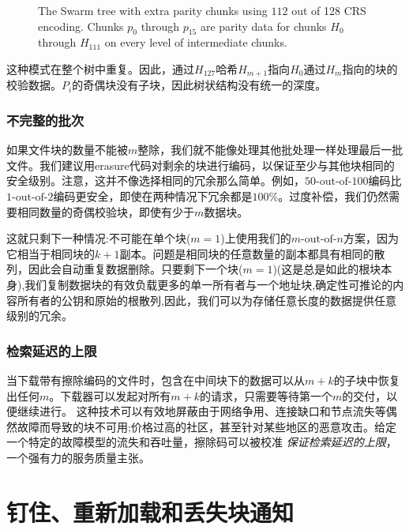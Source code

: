 \begin{figure}[htbp]
   \centering
   \resizebox{1\textwidth}{!}{
        
   }
   \caption[Swarm hash erasure \statusgreen]{The Swarm tree with extra parity chunks using $112$ out of 128 CRS encoding. Chunks $p_{0}$ through $p_{15}$ are parity data for chunks $H_0 $ through $H_{111}$ on every level of intermediate chunks.}
   \label{fig:Swarm-hash-erasure}
\end{figure}


这种模式在整个树中重复。因此，通过$H_{127}$哈希$H_{m+1}$指向$H_0$通过$H_{m}$指向的块的校验数据。$P_i$的奇偶块没有子块，因此树状结构没有统一的深度。

\subsubsection{不完整的批次}

如果文件块的数量不能被$m$整除，我们就不能像处理其他批处理一样处理最后一批文件。我们建议用erasure代码对剩余的块进行编码，以保证至少与其他块相同的安全级别。注意，这并不像选择相同的冗余那么简单。例如，$50\text{-out-of-}100$编码比$1\text{-out-of-}2$编码更安全，即使在两种情况下冗余都是$100\%$。过度补偿，我们仍然需要相同数量的奇偶校验块，即使有少于$m$数据块。

这就只剩下一种情况:不可能在单个块($m=1$)上使用我们的$m\text{-out-of-}n$方案，因为它相当于相同块的$k+1$副本。问题是相同块的任意数量的副本都具有相同的散列，因此会自动重复数据删除。只要剩下一个块($m=1$)(这是总是如此的根块本身),我们复制数据块的有效负载更多的单一所有者与一个地址块,确定性可推论的内容所有者的公钥和原始的根散列,因此，我们可以为存储任意长度的数据提供任意级别的冗余。

\subsubsection{检索延迟的上限}

当下载带有擦除编码的文件时，包含在中间块下的数据可以从$m+k$的子块中恢复出任何$m$。下载器可以发起对所有$m+k$的请求，只需要等待第一个$m$的交付，以便继续进行。
这种技术可以有效地屏蔽由于网络争用、连接缺口和节点流失等偶然故障而导致的块不可用;价格过高的社区，甚至针对某些地区的恶意攻击。给定一个特定的故障模型的流失和吞吐量，擦除码可以被校准
\emph{保证检索延迟的上限}，一个强有力的服务质量主张。





\section{钉住、重新加载和丢失块通知\statusyellow}\label{sec:reupload}

